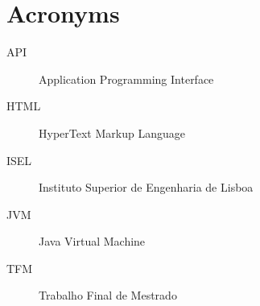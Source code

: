 \chapter*{Acronyms}

\begin{description}
    \item[API] Application Programming Interface
    \item[HTML] HyperText Markup Language
    \item[ISEL] Instituto Superior de Engenharia de Lisboa
    \item[JVM] Java Virtual Machine
    \item[TFM] Trabalho Final de Mestrado
\end{description}
\newpage
